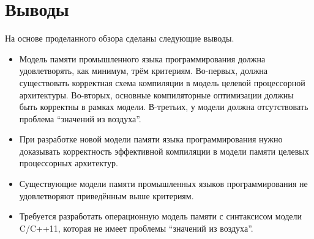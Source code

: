 
\section{Выводы}
На основе проделанного обзора сделаны следующие выводы.
\begin{itemize}
  \item Модель памяти промышленного языка программирования должна удовлетворять, как минимум, трём критериям.
    Во-первых, должна существовать корректная схема компиляции в модель целевой процессорной
    архитектуры.
    Во-вторых, основные компиляторные оптимизации должны быть корректны в рамках модели.
    В-третьих, у модели должна отсутствовать проблема ``значений из воздуха''.
  \item При разработке новой модели памяти языка программирования нужно доказывать корректность эффективной компиляции
     в модели памяти целевых процессорных архитектур.
  \item Существующие модели памяти промышленных языков программирования не удовлетворяют
    приведённым выше критериям.
  \item Требуется разработать операционную модель памяти с синтаксисом модели C/C++11, которая
    не имеет проблемы ``значений из воздуха''.
\end{itemize}

